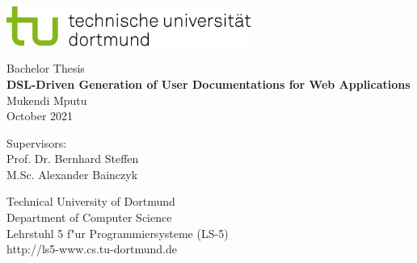\begin{titlepage}
\vspace*{-2cm}
\newlength{\links}
\setlength{\links}{-1.5cm}
\sffamily
\hspace*{\links}
\begin{minipage}{12.5cm}
\includegraphics[width=8cm]{bilder/tud_logo_rgb}
\end{minipage}

\vspace*{4cm}

\hspace*{\links}
\hspace*{-0.2cm}
\begin{minipage}{9cm}
\large
\begin{center}
{\Large Bachelor Thesis} \\
\vspace*{1cm}
\textbf{DSL-Driven Generation of User Documentations for Web Applications} \\
\vspace*{1cm}
Mukendi Mputu\\
October 2021
\end{center}
\end{minipage}
\normalsize
\vspace*{5.5cm}


\vspace*{2.1cm}

\hspace*{\links}
\begin{minipage}[b]{5cm}
\raggedright
Supervisors: \\
Prof. Dr. Bernhard Steffen \\
M.Sc. Alexander Bainczyk\\
\end{minipage}

\vspace*{2.5cm}
\hspace*{\links}
\begin{minipage}[b]{8cm}
\raggedright
Technical University of Dortmund \\
Department of Computer Science\\
Lehrstuhl 5 f"ur Programmiersysteme (LS-5)\\
http://ls5-www.cs.tu-dortmund.de
\end{minipage}

\end{titlepage}
